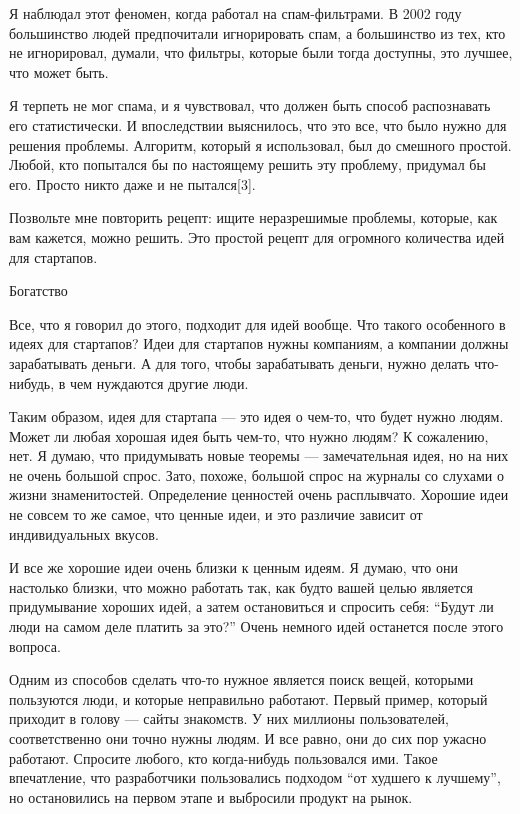\documentclass[ebook,12pt,oneside,openany]{memoir}
\begin{document}
Я наблюдал этот феномен, когда работал на спам-фильтрами. В 2002 году
большинство людей предпочитали игнорировать спам, а большинство из
тех, кто не игнорировал, думали, что фильтры, которые были тогда
доступны, это лучшее, что может быть.

Я терпеть не мог спама, и я чувствовал, что должен быть способ
распознавать его статистически. И впоследствии выяснилось, что это
все, что было нужно для решения проблемы. Алгоритм, который я
использовал, был до смешного простой. Любой, кто попытался бы по
настоящему решить эту проблему, придумал бы его. Просто никто даже и
не пытался[3].

Позвольте мне повторить рецепт: ищите неразрешимые проблемы, которые,
как вам кажется, можно решить. Это простой рецепт для огромного
количества идей для стартапов.

Богатство

Все, что я говорил до этого, подходит для идей вообще. Что такого
особенного в идеях для стартапов? Идеи для стартапов нужны компаниям,
а компании должны зарабатывать деньги. А для того, чтобы зарабатывать
деньги, нужно делать что-нибудь, в чем нуждаются другие люди.

Таким образом, идея для стартапа — это идея о чем-то, что будет нужно
людям. Может ли любая хорошая идея быть чем-то, что нужно людям? К
сожалению, нет. Я думаю, что придумывать новые теоремы — замечательная
идея, но на них не очень большой спрос. Зато, похоже, большой спрос на
журналы со слухами о жизни знаменитостей. Определение ценностей очень
расплывчато. Хорошие идеи не совсем то же самое, что ценные идеи, и
это различие зависит от индивидуальных вкусов.

И все же хорошие идеи очень близки к ценным идеям. Я думаю, что они
настолько близки, что можно работать так, как будто вашей целью
является придумывание хороших идей, а затем остановиться и спросить
себя: “Будут ли люди на самом деле платить за это?” Очень немного идей
останется после этого вопроса.

Одним из способов сделать что-то нужное является поиск вещей, которыми
пользуются люди, и которые неправильно работают. Первый пример,
который приходит в голову — сайты знакомств. У них миллионы
пользователей, соответственно они точно нужны людям. И все равно, они
до сих пор ужасно работают. Спросите любого, кто когда-нибудь
пользовался ими. Такое впечатление, что разработчики пользовались
подходом “от худшего к лучшему”, но остановились на первом этапе и
выбросили продукт на рынок.
\end{document}
